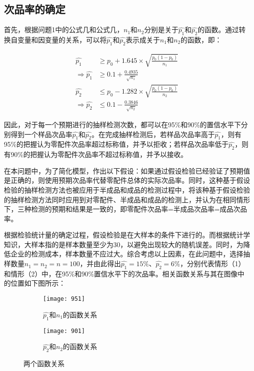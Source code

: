 \documentclass[withoutpreface,bwprint]{cumcmthesis} %
\begin{document}
\subsection{次品率的确定}
首先，根据问题1中的公式几和公式几，$n_1$和$n_2$分别是关于$\hat{p_1}$和$\hat{p_2}$的函数。通过转换自变量和因变量的关系，可以将$\hat{p_1}$和$\hat{p_2}$表示成关于$n_1$和$n_2$的函数，即：

	\begin{equation}
	\begin{aligned}
			\hat{p_1} &\geqslant p_0 + 1.645 \times \sqrt{\frac{p_0 (1-p_0)}{n_1}} \\
			\Rightarrow \hat{p_1} &\geqslant 0.1 + \frac{0.4935}{\sqrt{n_1}}
		\end{aligned}
\end{equation}
\begin{equation}
	\begin{aligned}
			\hat{p_2} &\leqslant p_0 - 1.282 \times \sqrt{\frac{p_0 (1-p_0)}{n_2}} \\
			\Rightarrow \hat{p_2} &\leqslant 0.1 - \frac{0.3846}{\sqrt{n_2}}
		\end{aligned}
\end{equation}

因此，对于每一个预期进行的抽样检测次数，都可以在95\%和90\%的置信水平下分别得到一个样品次品率$\hat{p_1}$和$\hat{p_2}$。在完成抽样检测后，若样品次品率高于$\hat{p_1}$，则有95\%的把握认为零配件次品率超过标称值，并予以拒收；若样品次品率低于$\hat{p_2}$，则有90\%的把握认为零配件次品率不超过标称值，并予以接收。

在本问题中，为了简化模型，作出以下假设：如果通过假设检验已经验证了预期值是正确的，则使用预期次品率代替零配件总体的实际次品率。同时，这种基于假设检验的抽样检测方法也被应用于半成品和成品的检测过程中，将该种基于假设检验的抽样检测方法同时应用到对零配件、半成品和成品的检测上，并认为在相同情形下，三种检测的预期和结果是一致的，即零配件次品率=半成品次品率=成品次品率。

根据检验统计量的确定过程，假设检验是在大样本的条件下进行的。而根据统计学知识，大样本指的是样本数量至少为30，以避免出现较大的随机误差。同时，为降低企业的检测成本，样本数量不应过大。综合考虑以上因素，在此问题中，选择抽样数量$n_1=n_2=n=100$，并由此得出$\hat{p_1}=15\%$、$\hat{p_2}=6\%$，分别代表情形（1）和情形（2）中，在95\%和90\%置信水平下的次品率。相关函数关系与其在图像中的位置如下图所示：

\begin{figure}[htbp]
	\centering
	\begin{subfigure}[t]{0.49\textwidth}
		\centering
		\texttt{[image: 951]}
		\caption{$\hat{p_1}$和$n_1$的函数关系}
		\label{fig:sub1}
	\end{subfigure}
	\hfill
	\begin{subfigure}[t]{0.49\textwidth}
		\centering
		\texttt{[image: 901]}
		\caption{$\hat{p_2}$和$n_2$的函数关系}
		\label{fig:sub2}
	\end{subfigure}
	\caption{两个函数关系}
	\label{fig:both}
\end{figure}
\end{document}
